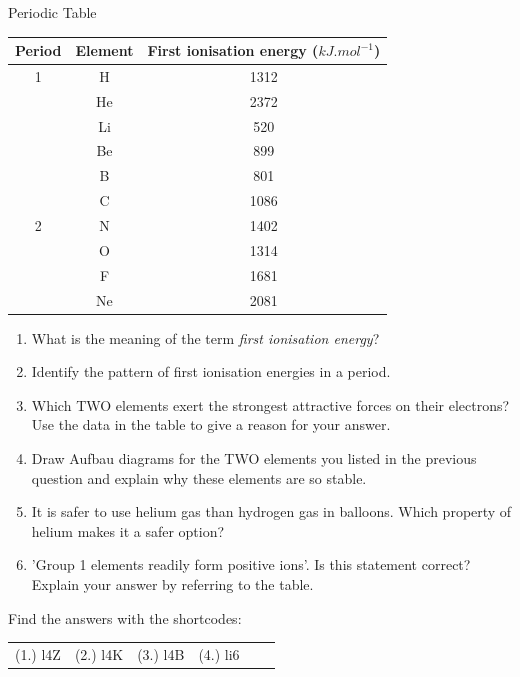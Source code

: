 \begin{eocexercises}{ Periodic Table}
\begin{enumerate}[noitemsep, label=\textbf{\arabic*}. ]
\begin{center}
\begin{tabular}{|c|c|c|}
Period&Element&First ionisation energy ($kJ.mol^{-1}$)\\[6pt] \hline 
1&H&1312\\ &He&2372\\ \hline 
&Li&520\\ &Be&899\\ &B&801\\ &C&1086\\ 2&N&1402\\ &O&1314\\ &F&1681\\ &Ne&2081\\ \hline 
\end{tabular}
\end{center} 
    \par
  \label{m38757*id264201}\begin{enumerate}[noitemsep, label=\textbf{\alph*}. ] 
            \label{m38757*uid223}\item What is the meaning of the term \textsl{first ionisation energy}?
\label{m38757*uid224}\item Identify the pattern of first ionisation energies in a period.
\label{m38757*uid225}\item Which TWO elements exert the strongest attractive forces on their electrons? Use the data in the table to give a reason for your answer.
\label{m38757*uid226}\item Draw Aufbau diagrams for the TWO elements you listed in the previous question and explain why these elements are so stable.
\label{m38757*uid227}\item It is safer to use helium gas than hydrogen gas in balloons. Which property of helium makes it a safer option?
\label{m38757*uid228}\item 'Group 1 elements readily form positive ions'.
Is this statement correct? Explain your answer by referring to the table.
\end{enumerate}
        \end{enumerate}
\label{m38757**end}
  \label{4e3d8e3d8992782b4e5d6fd958df32f9**end}
\par {} Find the answers with the shortcodes:
 \par \begin{tabular}[h]{cccccc}
 (1.) l4Z  &  (2.) l4K  &  (3.) l4B  &  (4.) li6  & \end{tabular}
\end{eocexercises}
